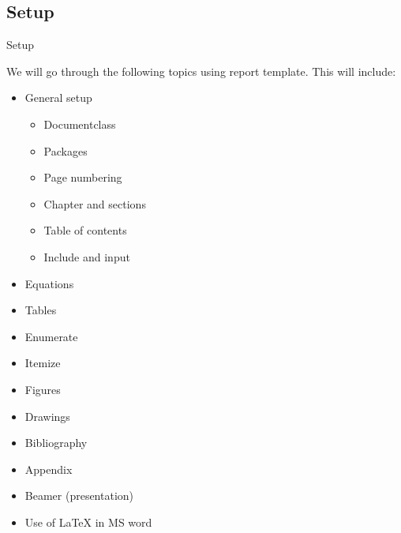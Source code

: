 \subsection{Setup}
\begin{frame}{Setup}

We will go through the following topics using report template. This will include:
\vfill
\begin{minipage}{0.49\textwidth}
\begin{itemize}
    \item General setup
    \begin{itemize}
        \item Documentclass
        \item Packages
        \item Page numbering
        \item Chapter and sections
        \item Table of contents 
        \item Include and input
    \end{itemize}
    \item Equations
    \item Tables
    \item Enumerate
\end{itemize}
\end{minipage}
\hfill
\begin{minipage}{0.49\textwidth}
\begin{itemize}
    \item Itemize
    \item Figures
    \item Drawings
    \item Bibliography
    \item Appendix
    \item Beamer (presentation)
    \item Use of \LaTeX{} in MS word
\end{itemize}
\end{minipage}
\end{frame}